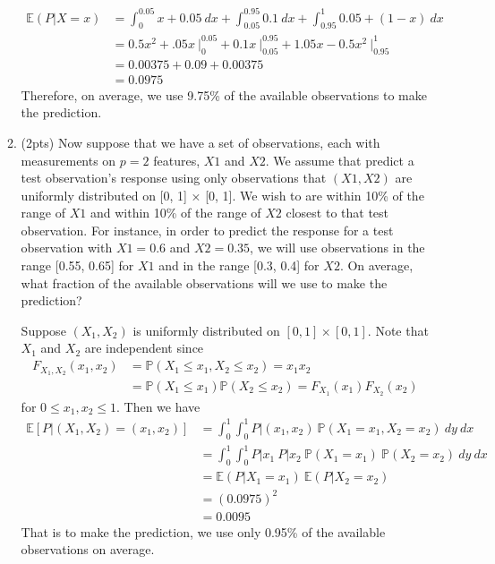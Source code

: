 \documentclass[a4paper]{article}
\theoremstyle{definition}
\newenvironment{soln}{
    \leavevmode\color{blue}\ignorespaces
}{}
\begin{document}
\begin{enumerate}
\begin{enumerate}
\begin{soln}
	$$\begin{aligned}
		\mathbb{E}(P|X = x) &= \int_0^{0.05} x + 0.05\:dx + \int_{0.05}^{0.95} 0.1\:dx + \int_{0.95}^1 0.05 + (1 - x)\:dx \\[1ex]
		&= 0.5x^2 + .05x \:\Big |_0^{0.05} + 0.1x \:\Big |_{0.05}^{0.95} + 1.05x - 0.5x^2 \:\Big |_{0.95}^1 \\[1ex]
		&= 0.00375 + 0.09 + 0.00375 \\[1ex]
		&= 0.0975
	\end{aligned}$$ Therefore, on average, we use 9.75\% of the available observations to make the prediction.
	\end{soln}
	
	\medskip
	
	\item (2pts) Now suppose that we have a set of observations, each with measurements on $p =2$ features, $X1$ and $X2$. We assume that predict a test observation’s response using only observations that $(X1,X2)$ are uniformly distributed on [0, 1] × [0, 1]. We wish to are within 10\% of the range of $X1$ and within 10\% of the range of $X2$ closest to that test observation. For instance, in order to predict the response for a test observation with $X1 =0.6$ and $X2 =0.35$, we will use observations in the range [0.55, 0.65] for $X1$ and in the range [0.3, 0.4] for $X2$. On average, what fraction of the available observations will we use to make the prediction?
	
	\begin{soln}  
		Suppose $(X_1, X_2)$ is uniformly distributed on $[0, 1] \times [0,1]$. Note that $X_1$ and $X_2$ are independent since
		$$\begin{aligned}
			F_{X_1, X_2}(x_1, x_2) &= \mathbb{P}(X_1 \leq x_1, X_2 \leq x_2) = x_1x_2 \\[1ex]
			&=\mathbb{P}(X_1 \leq x_1)\mathbb{P}(X_2 \leq x_2) = F_{X_1}(x_1)F_{X_2}(x_2) 
		\end{aligned}$$ for $0 \leq x_1, x_2 \leq 1$. Then we have
			$$\begin{aligned}
			\mathbb{E}[P|(X_1, X_2) = (x_1, x_2)]& = \int_0^1 \int_0^1 P|(x_1, x_2) \:\mathbb{P}(X_1 = x_1, X_2 = x_2)\:dy\:dx \\[1ex]
			&= \int_0^1 \int_0^1 P|x_1\: P|x_2\:\mathbb{P}(X_1 = x_1)\:\mathbb{P}(X_2 = x_2)\:dy\:dx \\[1ex]
			&= \mathbb{E}(P | X_1 = x_1)\:\mathbb{E}(P|X_2 = x_2) \\[1ex]
			&= (0.0975)^2 \\[1ex]
			&= 0.0095
		\end{aligned}$$ That is to make the prediction, we use only 0.95\% of the available observations on average.
	

\end{soln}
\end{enumerate}
\end{enumerate}
\end{document}
